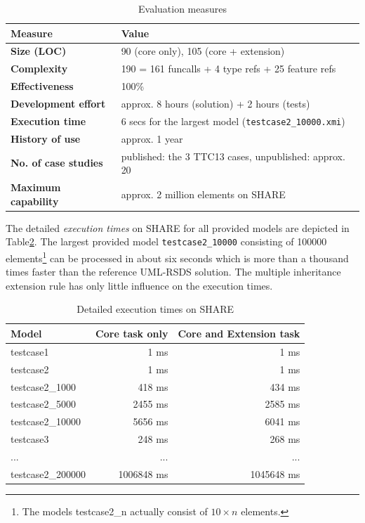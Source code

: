 \documentclass[submission]{eptcs}
\begin{document}
\begin{table}[htb]
  \footnotesize
  \centering
  \begin{tabular}{| l | l |}
    \hline
    \textbf{Measure}            & \textbf{Value}\\
    \hline
    \textbf{Size (LOC)}         & 90 (core only), 105 (core + extension)\\
    \textbf{Complexity}         & 190 = 161 funcalls + 4 type refs + 25 feature refs\\
    \textbf{Effectiveness}      & 100\%\\
    \textbf{Development effort} & approx. 8 hours (solution) + 2 hours (tests)\\
    \textbf{Execution time}     & 6 secs for the largest model (\verb|testcase2_10000.xmi|)\\
    \textbf{History of use}     & approx. 1 year\\
    \textbf{No. of case studies}& published: the 3 TTC13 cases, unpublished: approx. 20\\
    \textbf{Maximum capability} & approx. 2 million elements on SHARE\\
    \hline
  \end{tabular}
  \caption{Evaluation measures}
  \label{tab:evaluation}
\end{table}

The detailed \emph{execution times} on SHARE for all provided models are
depicted in Table\ref{tab:exec-times}.  The largest provided model
\verb|testcase2_10000| consisting of 100000 elements\footnote{The models
  \textsf{testcase2\_n} actually consist of $10\times n$ elements.} can be
processed in about six seconds which is more than a thousand times faster than
the reference UML-RSDS solution.  The multiple inheritance extension rule has
only little influence on the execution times.

\begin{table}[htb]
  \footnotesize
  \centering
  \begin{tabular}{| l | r | r |}
    \hline
    \textbf{Model}    & \textbf{Core task only} & \textbf{Core and Extension task}\\
    \hline
    \textsf{testcase1}         & 1 ms      & 1 ms\\
    \textsf{testcase2}         & 1 ms      & 1 ms\\
    \textsf{testcase2\_1000}   & 418 ms    & 434 ms\\
    \textsf{testcase2\_5000}   & 2455 ms   & 2585 ms\\
    \textsf{testcase2\_10000}  & 5656 ms   & 6041 ms\\
    \textsf{testcase3}         & 248 ms    & 268 ms\\
    \hline
    \textsf{...}               & ...        & ...\\
    \textsf{testcase2\_200000} & 1006848 ms & 1045648 ms\\
    \hline
  \end{tabular}
  \caption{Detailed execution times on SHARE}
  \label{tab:exec-times}
\end{table}
\end{document}
